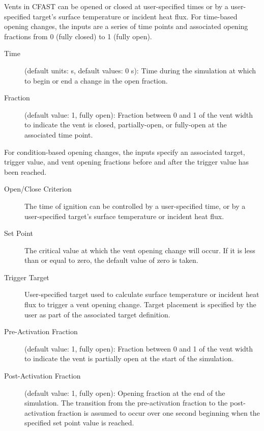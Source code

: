 {{Vents in CFAST can be opened or closed at user-specified times or by a user-specified target's surface temperature or incident heat flux. For time-based opening changes, the inputs are a series of time points and associated opening fractions from 0 (fully closed) to 1 (fully open).

\begin{description}
\item[Time] (default units: s, default values: 0 s): Time during the simulation at which to begin or end a change in the open fraction.
\item[Fraction] (default value: 1, fully open): Fraction between 0 and 1 of the vent width to indicate the vent is closed, partially-open, or fully-open at the associated time point.
\end{description}


For condition-based opening changes, the inputs specify an associated target, trigger value, and vent opening fractions before and after the trigger value has been reached.

\begin{description}
\item[Open/Close Criterion] The time of ignition can be controlled by a user-specified time, or by a user-specified target's surface temperature or incident heat flux.
\item[Set Point] The critical value at which the vent opening change will occur. If it is less than or equal to zero, the default value of zero is taken.
\item[Trigger Target] User-specified target used to calculate surface temperature or incident heat flux to trigger a vent opening change. Target placement is specified by the user as part of the associated target definition.
\item[Pre-Activation Fraction] (default value: 1, fully open): Fraction between 0 and 1 of the vent width to indicate the vent is partially open at the start of the simulation.
\item[Post-Activation Fraction] (default value: 1, fully open): Opening fraction at the end of the simulation. The transition from the pre-activation fraction to the post-activation fraction is assumed to occur over one second beginning when the specified set point value is reached.
\end{description}




}}
